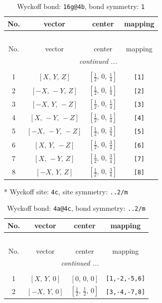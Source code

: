 \documentclass[fleqn,8pt]{jsarticle}
\begin{document}
\begin{longtable}{cccc}
\caption{Wyckoff bond: {\tt 16g@4b}, bond symmetry: {\tt 1}}
 \\
 \hline \hline
No. & vector & center & mapping \\ \hline \endfirsthead

\multicolumn{3}{l}{\tablename\ \thetable{}} \\
 \hline \hline
No. & vector & center & mapping \\ \hline \endhead

 \hline \hline
\multicolumn{3}{r}{\footnotesize\it continued ...} \\ \endfoot

 \hline \hline
\multicolumn{3}{r}{} \\ \endlastfoot

1 & $\left[ X,\, Y,\, Z \right]$ & $\left[ \frac{1}{2},\, 0,\, \frac{1}{4} \right]$ & {\tt [1]} \\ \hline
2 & $\left[ - X,\, - Y,\, Z \right]$ & $\left[ \frac{1}{2},\, 0,\, \frac{1}{4} \right]$ & {\tt [2]} \\ \hline
3 & $\left[ - X,\, Y,\, - Z \right]$ & $\left[ \frac{1}{2},\, 0,\, \frac{1}{4} \right]$ & {\tt [3]} \\ \hline
4 & $\left[ X,\, - Y,\, - Z \right]$ & $\left[ \frac{1}{2},\, 0,\, \frac{1}{4} \right]$ & {\tt [4]} \\ \hline
5 & $\left[ - X,\, - Y,\, - Z \right]$ & $\left[ \frac{1}{2},\, 0,\, \frac{3}{4} \right]$ & {\tt [5]} \\ \hline
6 & $\left[ X,\, Y,\, - Z \right]$ & $\left[ \frac{1}{2},\, 0,\, \frac{3}{4} \right]$ & {\tt [6]} \\ \hline
7 & $\left[ X,\, - Y,\, Z \right]$ & $\left[ \frac{1}{2},\, 0,\, \frac{3}{4} \right]$ & {\tt [7]} \\ \hline
8 & $\left[ - X,\, Y,\, Z \right]$ & $\left[ \frac{1}{2},\, 0,\, \frac{3}{4} \right]$ & {\tt [8]} \\
\end{longtable}
* Wyckoff site: {\tt 4c}, site symmetry: {\tt ..2/m}
\renewcommand{\arraystretch}{1.2}
\begin{longtable}{cccc}
\caption{Wyckoff bond: {\tt 4a@4c}, bond symmetry: {\tt ..2/m}}
 \\
 \hline \hline
No. & vector & center & mapping \\ \hline \endfirsthead

\multicolumn{3}{l}{\tablename\ \thetable{}} \\
 \hline \hline
No. & vector & center & mapping \\ \hline \endhead

 \hline \hline
\multicolumn{3}{r}{\footnotesize\it continued ...} \\ \endfoot

 \hline \hline
\multicolumn{3}{r}{} \\ \endlastfoot

1 & $\left[ X,\, Y,\, 0 \right]$ & $\left[ 0,\, 0,\, 0 \right]$ & {\tt [1,-2,-5,6]} \\ \hline
2 & $\left[ - X,\, Y,\, 0 \right]$ & $\left[ \frac{1}{2},\, \frac{1}{2},\, 0 \right]$ & {\tt [3,-4,-7,8]} \\
\end{longtable}
\end{document}
